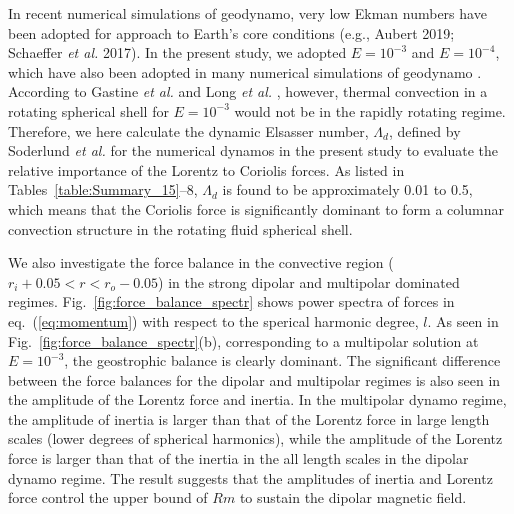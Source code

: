 

{\color{red}
In recent numerical simulations of geodynamo, very low Ekman numbers have been adopted for approach to Earth's core conditions (e.g., Aubert 2019; Schaeffer {\it et al.} 2017).
In the present study, we adopted $E = 10^{-3}$ and $E = 10^{-4}$,
which have also been adopted in many numerical simulations of geodynamo \cite{pena:2018}.
According to Gastine {\it et al.}   and Long {\it et al.} , however, thermal convection in a rotating spherical shell for $E = 10^{-3}$ would not be in the rapidly rotating regime.
Therefore, we here calculate the dynamic Elsasser number, $\Lambda_d$, defined by Soderlund {\it et al.}  for the numerical dynamos in the present study to evaluate the relative importance of the Lorentz to Coriolis forces. 
As listed in Tables~\ref{table:Summary_15}--8, $\Lambda_d$ is found to be approximately 0.01 to 0.5, which means that the Coriolis force is significantly %
{\color{red} dominant} to form a columnar convection structure in the rotating fluid spherical shell.
}

{\color{blue}
We also investigate the force balance in the convective region ($r_{i} + 0.05 < r < r_{o} - 0.05$) in the strong dipolar and multipolar dominated regimes.
Fig.~\ref{fig:force_balance_spectr} shows power spectra of forces in eq.~(\ref{eq:momentum}) with respect to the sperical harmonic degree, $l$.
As seen in Fig.~\ref{fig:force_balance_spectr}(b), corresponding to a multipolar solution at $E = 10^{-3}$, the geostrophic balance is clearly dominant.
The significant difference between the force balances for the dipolar and multipolar regimes is also seen in the amplitude of the Lorentz force and inertia.
In the multipolar dynamo regime, the amplitude of inertia is larger than that of the Lorentz force in large length scales (lower degrees of spherical harmonics), while the amplitude of the Lorentz force is larger than that of the inertia in the all length scales in the dipolar dynamo regime.
}
{\color{green}
The result suggests that the amplitudes of inertia and Lorentz force control the upper bound of $Rm$ to sustain the dipolar magnetic field.
}%


